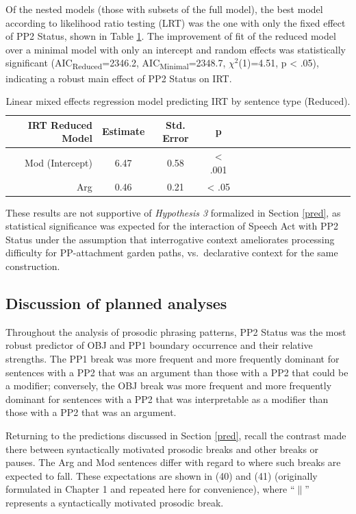 \documentclass[11pt,oneside]{book}
\begin{document}
Of the nested models (those with subsets of the full model), the best model according to likelihood ratio testing (LRT) was the one with only the fixed effect of PP2 Status, shown in Table \ref{tab:redirt}. The improvement of fit of the reduced model over a minimal model with only an intercept and random effects was statistically significant (AIC\textsubscript{Reduced}=2346.2, AIC\textsubscript{Minimal}=2348.7, \(\chi^2\)(1)=4.51, p \textless{} .05), indicating a robust main effect of PP2 Status on IRT.

\begin{table}[!h]

\caption{\label{tab:redirt}Linear mixed effects regression model predicting IRT by sentence type (Reduced).}
\centering
\begin{tabular}{rcccrcccrcccrccc}
\toprule
IRT Reduced Model & Estimate & Std. Error & p\\
\midrule
Mod (Intercept) & 6.47 & 0.58 & < .001\\
Arg & 0.46 & 0.21 & < .05\\
\bottomrule
\end{tabular}
\end{table}

These results are not supportive of \emph{Hypothesis 3} formalized in Section \ref{pred}, as statistical significance was expected for the interaction of Speech Act with PP2 Status under the assumption that interrogative context ameliorates processing difficulty for PP-attachment garden paths, vs.~declarative context for the same construction.

\hypertarget{discussion-of-planned-analyses}{%
\subsection{Discussion of planned analyses}\label{discussion-of-planned-analyses}}

Throughout the analysis of prosodic phrasing patterns, PP2 Status was the most robust predictor of OBJ and PP1 boundary occurrence and their relative strengths. The PP1 break was more frequent and more frequently dominant for sentences with a PP2 that was an argument than those with a PP2 that could be a modifier; conversely, the OBJ break was more frequent and more frequently dominant for sentences with a PP2 that was interpretable as a modifier than those with a PP2 that was an argument.

Returning to the predictions discussed in Section \ref{pred}, recall the contrast made there between syntactically motivated prosodic breaks and other breaks or pauses. The Arg and Mod sentences differ with regard to where such breaks are expected to fall. These expectations are shown in (40) and (41) (originally formulated in Chapter 1 and repeated here for convenience), where ``\(\|\)'' represents a syntactically motivated prosodic break.
\end{document}
